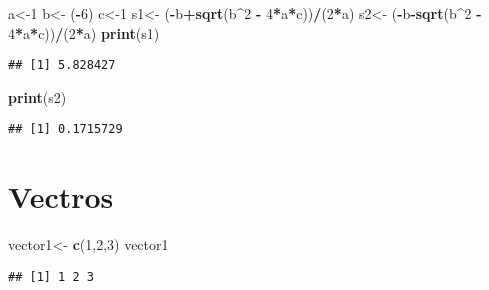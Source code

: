\documentclass[
]{article}
\newenvironment{Shaded}{\begin{snugshade}}{\end{snugshade}}
\newcommand{\DecValTok}[1]{\textcolor[rgb]{0.00,0.00,0.81}{#1}}
\newcommand{\FunctionTok}[1]{\textcolor[rgb]{0.13,0.29,0.53}{\textbf{#1}}}
\newcommand{\NormalTok}[1]{#1}
\newcommand{\OtherTok}[1]{\textcolor[rgb]{0.56,0.35,0.01}{#1}}
\newcommand{\SpecialCharTok}[1]{\textcolor[rgb]{0.81,0.36,0.00}{\textbf{#1}}}
\begin{document}
\begin{Shaded}
\begin{Highlighting}[]
\NormalTok{a}\OtherTok{\textless{}{-}}\DecValTok{1}
\NormalTok{b}\OtherTok{\textless{}{-}}\NormalTok{ (}\SpecialCharTok{{-}}\DecValTok{6}\NormalTok{)}
\NormalTok{c}\OtherTok{\textless{}{-}}\DecValTok{1}
\NormalTok{s1}\OtherTok{\textless{}{-}}\NormalTok{ (}\SpecialCharTok{{-}}\NormalTok{b}\SpecialCharTok{+}\FunctionTok{sqrt}\NormalTok{(b}\SpecialCharTok{\^{}}\DecValTok{2} \SpecialCharTok{{-}} \DecValTok{4}\SpecialCharTok{*}\NormalTok{a}\SpecialCharTok{*}\NormalTok{c))}\SpecialCharTok{/}\NormalTok{(}\DecValTok{2}\SpecialCharTok{*}\NormalTok{a)}
\NormalTok{s2}\OtherTok{\textless{}{-}}\NormalTok{ (}\SpecialCharTok{{-}}\NormalTok{b}\SpecialCharTok{{-}}\FunctionTok{sqrt}\NormalTok{(b}\SpecialCharTok{\^{}}\DecValTok{2} \SpecialCharTok{{-}} \DecValTok{4}\SpecialCharTok{*}\NormalTok{a}\SpecialCharTok{*}\NormalTok{c))}\SpecialCharTok{/}\NormalTok{(}\DecValTok{2}\SpecialCharTok{*}\NormalTok{a)}
\FunctionTok{print}\NormalTok{(s1)}
\end{Highlighting}
\end{Shaded}

\begin{verbatim}
## [1] 5.828427
\end{verbatim}

\begin{Shaded}
\begin{Highlighting}[]
\FunctionTok{print}\NormalTok{(s2)}
\end{Highlighting}
\end{Shaded}

\begin{verbatim}
## [1] 0.1715729
\end{verbatim}

\hypertarget{vectros}{%
\section{Vectros}\label{vectros}}

\begin{Shaded}
\begin{Highlighting}[]
\NormalTok{vector1}\OtherTok{\textless{}{-}} \FunctionTok{c}\NormalTok{(}\DecValTok{1}\NormalTok{,}\DecValTok{2}\NormalTok{,}\DecValTok{3}\NormalTok{)}
\NormalTok{vector1}
\end{Highlighting}
\end{Shaded}

\begin{verbatim}
## [1] 1 2 3
\end{verbatim}
\end{document}

